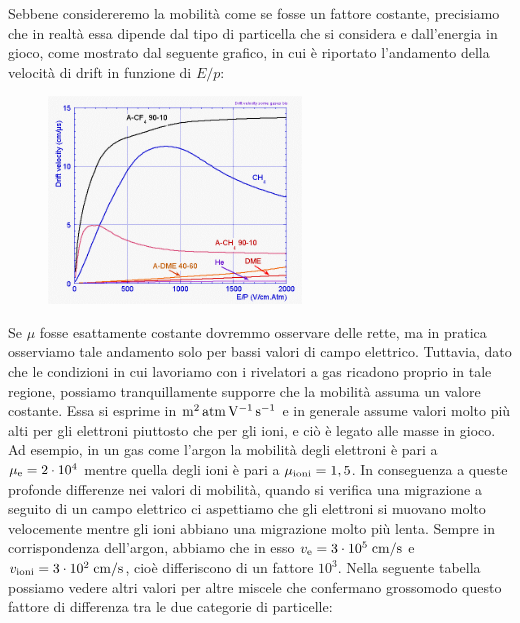 Sebbene considereremo la mobilità come se fosse un fattore costante, precisiamo che in realtà essa dipende dal tipo di particella che si considera e dall'energia in gioco, come mostrato dal seguente grafico, in cui è riportato l'andamento della velocità di drift in funzione di $E/p$:
\begin{figure}[H]
   \centering
   \includegraphics[width=0.6\textwidth]{immagini/mobilita.png}
\end{figure}
Se $\mu$ fosse esattamente costante dovremmo osservare delle rette, ma in pratica osserviamo tale andamento solo per bassi valori di campo elettrico. Tuttavia, dato che le condizioni in cui lavoriamo con i rivelatori a gas ricadono proprio in tale regione, possiamo tranquillamente supporre che la mobilità assuma un valore costante. Essa si esprime in $\rm m^2 \, atm \, V^{-1} \, s^{-1}$ e in generale assume valori molto più alti per gli elettroni piuttosto che per gli ioni, e ciò è legato alle masse in gioco. Ad esempio, in un gas come l'argon la mobilità degli elettroni è pari a $\mu_{\rm e}=2 \cdot 10^4$ mentre quella degli ioni è pari a $\mu_{\rm ioni}=1,5$. In conseguenza a queste profonde differenze nei valori di mobilità, quando si verifica una migrazione a seguito di un campo elettrico ci aspettiamo che gli elettroni si muovano molto velocemente mentre gli ioni abbiano una migrazione molto più lenta. Sempre in corrispondenza dell'argon, abbiamo che in esso $v_{\rm e}=3 \cdot 10^5 \; \rm cm/s$ e $v_{\rm ioni}=3 \cdot 10^2 \; \rm cm/s$, cioè differiscono di un fattore $10^3$. Nella seguente tabella possiamo vedere altri valori per altre miscele che confermano grossomodo questo fattore di differenza tra le due categorie di particelle:
